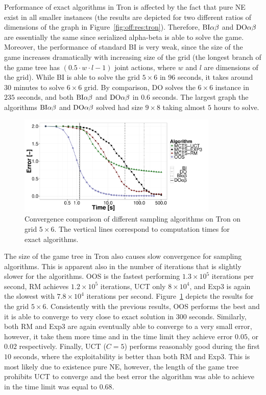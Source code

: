 Performance of exact algorithms in Tron is affected by the fact that pure NE exist in all smaller instances (the results are depicted for two different ratios of dimensions of the graph in Figure~\ref{fig:off:res:tron}).
Therefore, $\textrm{BI}\alpha\beta$ and $\textrm{DO}\alpha\beta$ are essentially the same since serialized alpha-beta is able to solve the game.
Moreover, the performance of standard BI is very weak, since the size of the game increases dramatically with increasing size of the grid (the longest branch of the game tree has $\left(0.5\cdot w\cdot l - 1\right)$ joint actions, where $w$ and $l$ are dimensions of the grid).
While BI is able to solve the grid $5\times6$ in $96$ seconds, it takes around $30$ minutes to solve $6\times6$ grid.
By comparison, DO solves the $6\times6$ instance in $235$ seconds, and both $\textrm{BI}\alpha\beta$ and $\textrm{DO}\alpha\beta$ in $0.6$ seconds.
The largest graph the algorithms $\textrm{BI}\alpha\beta$ and $\textrm{DO}\alpha\beta$ solved had size $9\times8$ taking almost $5$ hours to solve.

\begin{figure}[t]
\centering
\includegraphics[width=0.85\textwidth]{figures/convergence-tron.pdf}
\caption{Convergence comparison of different sampling algorithms on Tron on grid $5\times6$. The vertical lines correspond to computation times for exact algorithms.} \label{fig:off:conv:tron}
\end{figure}

The size of the game tree in Tron also causes slow convergence for sampling algorithms.
This is apparent also in the number of iterations that is slightly slower for the algorithms.
OOS is the fastest performing $1.3\times 10^5$ iterations per second, RM achieves $1.2\times 10^5$ iterations, UCT only $8\times10^4$, and Exp3 is again the slowest with $7.8\times10^4$ iterations per second.
Figure~\ref{fig:off:conv:tron} depicts the results for the grid $5\times6$.
Consistently with the previous results, OOS performs the best and it is able to converge to very close to exact solution in $300$ seconds.
Similarly, both RM and Exp3 are again eventually able to converge to a very small error, however, it take them more time and in the time limit they achieve error $0.05$, or $0.02$ respectively.
Finally, UCT ($C=5$) performs reasonably good during the first $10$ seconds, where the exploitability is better than both RM and Exp3.
This is most likely due to existence pure NE, however, the length of the game tree prohibits UCT to converge and the best error the algorithm was able to achieve in the time limit was equal to $0.68$.

